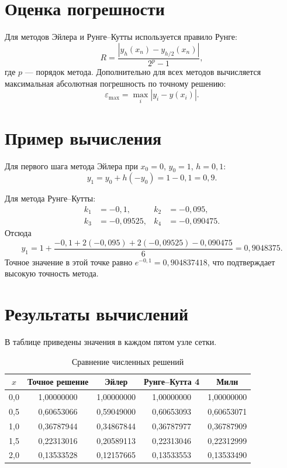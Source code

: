 \documentclass[12pt,a4paper]{article}
\begin{document}
\section{Оценка погрешности}
Для методов Эйлера и Рунге--Кутты используется правило Рунге:
\begin{equation}
 R=\frac{|y_h(x_n)-y_{h/2}(x_n)|}{2^p-1},
\end{equation}
где $p$ --- порядок метода. Дополнительно для всех методов вычисляется максимальная абсолютная погрешность по точному решению:
\begin{equation}
 \varepsilon_{\max}=\max_i|y_i-y(x_i)|.
\end{equation}

\section{Пример вычисления}
Для первого шага метода Эйлера при $x_0=0$, $y_0=1$, $h=0{,}1$:
\begin{equation}
 y_1=y_0+h(-y_0)=1-0{,}1=0{,}9.
\end{equation}

Для метода Рунге--Кутты:
\begin{align*}
 k_1&=-0{,}1, & k_2&=-0{,}095,\\
 k_3&=-0{,}09525, & k_4&=-0{,}090475.
\end{align*}
Отсюда
\begin{equation}
 y_1=1+\frac{-0{,}1+2(-0{,}095)+2(-0{,}09525)-0{,}090475}{6}
 =0{,}9048375.
\end{equation}
Точное значение в этой точке равно $e^{-0{,}1}=0{,}904837418$, что подтверждает высокую точность метода.

\section{Результаты вычислений}
В таблице приведены значения в каждом пятом узле сетки.

\begin{table}[H]
\centering
\caption{Сравнение численных решений}
\begin{tabular}{c|c|c|c|c}
\toprule
$x$ & Точное решение & Эйлер & Рунге--Кутта 4 & Милн \\
\midrule
0{,}0 & 1{,}00000000 & 1{,}00000000 & 1{,}00000000 & 1{,}00000000 \\
0{,}5 & 0{,}60653066 & 0{,}59049000 & 0{,}60653093 & 0{,}60653071 \\
1{,}0 & 0{,}36787944 & 0{,}34867844 & 0{,}36787977 & 0{,}36787909 \\
1{,}5 & 0{,}22313016 & 0{,}20589113 & 0{,}22313046 & 0{,}22312999 \\
2{,}0 & 0{,}13533528 & 0{,}12157665 & 0{,}13533553 & 0{,}13533490 \\
\bottomrule
\end{tabular}
\end{table}
\end{document}
